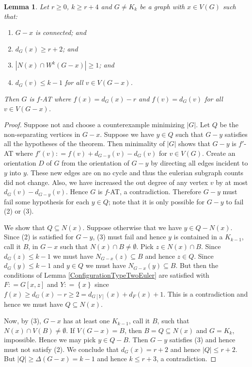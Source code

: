 \documentclass[12pt]{article}
\theoremstyle{plain}
\newtheorem{lem}[thm]{Lemma}
\theoremstyle{definition}
\theoremstyle{remark}
\newcommand{\set}[1]{\left\{ #1 \right\}}
\newcommand{\card}[1]{\left|#1\right|}
\newcommand{\DefinedAs}{\mathrel{\mathop:}=}
\begin{document}
\begin{lem}\label{ConfigurationTypeOneSingleEuler}
Let $r \geq 0$, $k \geq r + 4$ and $G \neq K_k$ be a graph with $x \in V(G)$ such that:
\begin{enumerate}
\item $G-x$ is connected; and
\item $d_G(x) \geq r + 2$; and
\item $\card{N(x) \cap W^k(G-x)} \geq 1$; and
\item $d_G(v) \leq k - 1$ for all $v \in V(G-x)$.
\end{enumerate}

\noindent Then $G$ is $f$-AT where $f(x) = d_G(x) - r$ and $f(v) = d_G(v)$ for all $v \in V(G - x)$.
\end{lem}
\begin{proof}
Suppose not and choose a counterexample minimizing $\card{G}$.  Let $Q$ be the non-separating vertices in $G-x$. Suppose we have $y \in Q$ such that $G-y$ satisfies all the hypotheses of the theorem. Then minimality of $\card{G}$ shows that $G-y$ is $f'$-AT where $f'(v) \DefinedAs f(v) + d_{G-y}(v) - d_G(v)$ for $v \in V(G)$.  Create an orientation $D$ of $G$ from the orientation of $G-y$ by directing all edges incident to $y$ into $y$.  These new edges are on no cycle and thus the eulerian subgraph counts did not change.  Also, we have increased the out degree of any vertex $v$ by at most $d_G(v) - d_{G-y}(v)$.  Hence $G$ is $f$-AT, a contradiction.  Therefore $G-y$ must fail some hypothesis for each $y \in Q$; note that it is only possible for $G-y$ to fail (2) or (3).

We show that $Q \subseteq N(x)$.  Suppose otherwise that we have $y \in Q - N(x)$.  
Since (2) is satisfied for $G-y$, (3) must fail and hence $y$ is contained in a $K_{k-1}$, call it $B$, in $G-x$ such that $N(x) \cap B \neq \emptyset$. Pick $z \in N(x) \cap B$. Since $d_G(z) \leq k-1$ we must have $N_{G-x}(z) \subseteq B$ and hence $z \in Q$.  Since $d_G(y) \leq k-1$ and $y \in Q$ we must have $N_{G-x}(y) \subseteq B$. But then the conditions of Lemma \ref{ConfigurationTypeTwoEuler} are satisfied with $F \DefinedAs G[x, z]$ and $Y \DefinedAs \set{x}$ since $f(x) \geq d_G(x) - r \geq 2 = d_{G[Y]}(x) + d_F(x) + 1$. This is a contradiction and hence we must have $Q \subseteq N(x)$.

Now, by (3), $G-x$ has at least one $K_{k-1}$, call it $B$, such that $N(x) \cap V(B) \neq \emptyset$.  If $V(G-x) = B$, then $B = Q \subseteq N(x)$ and $G = K_k$, impossible.  Hence we may pick $y \in Q - B$.  Then $G-y$ satisfies (3) and hence must not satisfy (2).  We conclude that $d_G(x) = r+2$ and hence $\card{Q} \leq r+2$.  But $\card{Q} \geq \Delta(G-x) = k-1$ and hence $k \leq r + 3$, a contradiction.
\end{proof}
\end{document}
